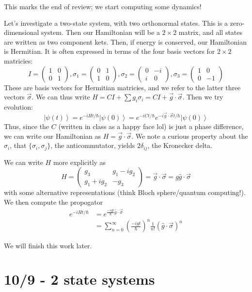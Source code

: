 \documentclass[10pt]{report}
\newcommand{\ket}[1]{\left|#1\right>}
\begin{document}
This marks the end of review; we start computing some dynamics!

Let's investigate a two-state system, with two orthonormal states. This is a zero-dimensional system. Then our Hamiltonian will be a $2\times2$ matrix, and all states are written as two component kets. Then, if energy is conserved, our Hamiltonian is Hermitian. It is often expressed in terms of the four basis vectors for $2\times2$ matricies:
$$I=\begin{pmatrix}1&0\\0&1\end{pmatrix},\sigma_1 = \begin{pmatrix}0&1\\1&0\end{pmatrix},\sigma_2=\begin{pmatrix}0&-i\\i&0\end{pmatrix},\sigma_3=\begin{pmatrix}1&0\\0&-1\end{pmatrix}$$
These are basis vectors for Hermitian matricies, and we refer to the latter three vectors $\vec{\sigma}$. We can thus write $H=CI +  \sum g_i\sigma_i = CI + \vec{g}\cdot\vec{\sigma}$. Then we try evolution:
$$\ket{\psi(t)}=e^{-iHt/\hbar}\ket{\psi(0)} = e^{-iCt/\hbar}e^{-i\vec{g}\cdot\vec{\sigma}t/\hbar}\ket{\psi(0)}$$
Thus, since the $C$ (written in class as a happy face lol) is just a phase difference, we can write our Hamiltonian as $H=\vec{g}\cdot\vec{\sigma}$. We note a curious property about the $\sigma_i$, that $\{\sigma_i,\sigma_j\}$, the anticommutator, yields $2\delta_{ij}$, the Kronecker delta.

We can write $H$ more explicitly as
$$H=\begin{pmatrix}g_3&g_1-ig_2\\g_1+ig_2&-g_3\end{pmatrix}=\vec{g}\cdot\vec{\sigma}=g\hat{g}\cdot\vec{\sigma}$$
with some alternative representations (think Bloch sphere/quantum computing!). We then compute the propogator
\begin{align}
	e^{-iHt/\hbar}&=e^{\frac{-igt}{\hbar}\hat{g}\cdot\vec{\sigma}}\\
	&= \sum_{n=0}^\infty \left( \frac{-igt}{\hbar} \right)^n \frac{1}{n!}\left( \hat{g}\cdot\vec{\sigma} \right)^n
\end{align}

We will finish this work later. 

\chapter{10/9 - 2 state systems}
\end{document}
